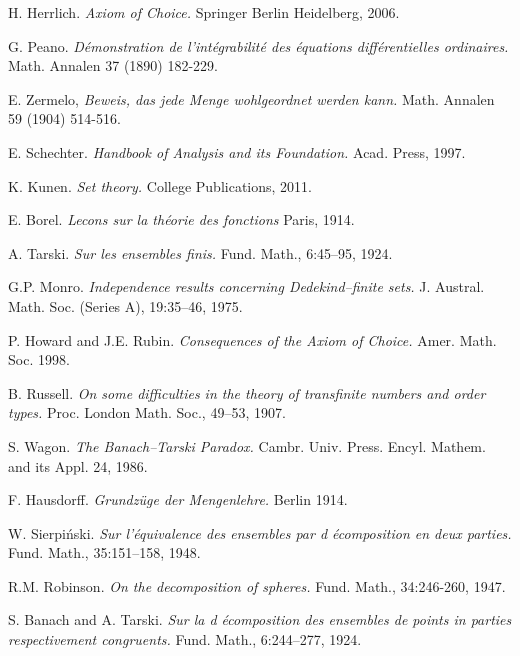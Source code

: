 \documentclass[12pt,a4paper]{report}
\theoremstyle{definition}
\theoremstyle{num.custom-title}
\begin{document}
\cleardoublepage

\begin{thebibliography}{3}

H. Herrlich. \emph{Axiom of Choice.} Springer Berlin Heidelberg, 2006.

G. Peano. \emph{Démonstration de l'intégrabilité des équations différentielles ordinaires.} Math. Annalen 37 (1890) 182-229.

E. Zermelo, \emph{Beweis, das jede Menge wohlgeordnet werden kann.} Math. Annalen 59 (1904) 514-516.

E. Schechter. \emph{Handbook of Analysis and its Foundation.} Acad. Press, 1997.

K. Kunen. \emph{Set theory.} College Publications, 2011.

E. Borel. \emph{Lecons sur la théorie des fonctions} Paris, 1914.

A. Tarski. \emph{Sur les ensembles finis.} Fund. Math., 6:45–95, 1924.

G.P. Monro. \emph{Independence results concerning Dedekind–finite sets.} J. Austral. Math. Soc. (Series A), 19:35–46, 1975.

P. Howard and J.E. Rubin. \emph{Consequences of the Axiom of Choice.} Amer. Math. Soc. 1998.

B. Russell. \emph{On some difficulties in the theory of transfinite numbers and order types.} Proc. London Math. Soc., 49–53, 1907.

S. Wagon. \emph{The Banach–Tarski Paradox.} Cambr. Univ. Press. Encyl. Mathem. and its Appl. 24, 1986.

F. Hausdorff. \emph{Grundzüge der Mengenlehre.} Berlin 1914.

W. Sierpiński. \emph{Sur l'équivalence des ensembles par d écomposition en deux parties.} Fund. Math., 35:151–158, 1948.

R.M. Robinson. \emph{On the decomposition of spheres.} Fund. Math., 34:246-260, 1947.

S. Banach and A. Tarski. \emph{Sur la d écomposition des ensembles de points in parties respectivement congruents.} Fund. Math., 6:244–277, 1924.


\end{thebibliography}
\end{document}
